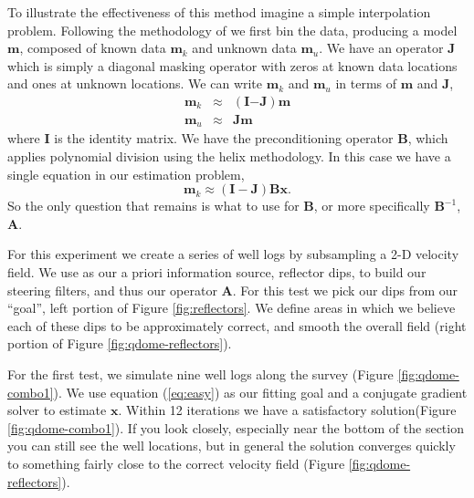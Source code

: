 To illustrate the effectiveness of this method
imagine a simple interpolation problem.
Following the methodology of \cite[]{Fomel.sep.95.sergey1} we first bin the 
data, producing
a model $\mathbf m$, composed of known data $\mathbf m_k$ and unknown data 
$\mathbf m_u$.  We 
have an operator $\mathbf J$ which is simply a diagonal masking operator with 
zeros at known data locations and ones at unknown locations. We can write
$\mathbf m_k$ and $\mathbf m_u$ in terms of $\mathbf m$ and $\mathbf J$,
\begin{eqnarray}
\mathbf m_k &\approx& (\mathbf I\mathbf - \mathbf J)\mathbf m \\
\mathbf m_u &\approx& \mathbf J \mathbf m
\end{eqnarray}
where $\mathbf I$ is the identity matrix.  
We have the preconditioning operator $\mathbf B$, which applies polynomial
division using the helix methodology.  In this case we have a 
single equation in our estimation problem,
\begin{equation}
\mathbf m_k \approx (\mathbf I-\mathbf J) \mathbf B \mathbf x .
\label{eq:easy}
\end{equation}
So the only question that remains is what to use for $\mathbf B$, or 
more specifically $\mathbf B^{-1}$, $\mathbf A$.
\par
For this experiment  
we create a series of well logs by subsampling a 2-D velocity field.
We use as our a priori information source, reflector dips,
to build  our steering filters, and thus our operator $\mathbf A$. 
For this test we  pick our dips  from our ``goal'',
left portion of Figure \ref{fig:reflectors}.
We define areas in which we believe each of these dips to be
approximately correct, and  smooth the overall 
field (right portion of Figure \ref{fig:qdome-reflectors}).


\par
For the first test, we simulate nine well logs along the survey
(Figure \ref{fig:qdome-combo1}). We use equation (\ref{eq:easy}) as our
fitting goal and  a conjugate gradient solver to estimate $\mathbf x$.
Within 12 iterations we  have a satisfactory 
solution(Figure \ref{fig:qdome-combo1}).
If you look closely, especially near the bottom of the section you
can still see the well locations, but in general the solution 
converges quickly to something 
fairly close to the correct velocity field (Figure \ref{fig:qdome-reflectors}). 


